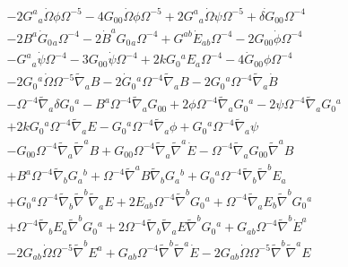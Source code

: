 \begin{eqnarray}
\nonumber\\
&&- 2 G^{a}{}_{a} \dot{\Omega} \phi \Omega^{-5} - 4 G_{00}{} \dot{\Omega} \phi \Omega^{-5}+ 2 G^{a}{}_{a} \dot{\Omega} \psi \Omega^{-5} + \dot{\delta G}_{00}{} \Omega^{-4} 
\nonumber\\
&&- 2 B^{a} \dot{G}_{0}{}_{a} \Omega^{-4} - 2 \dot{B}^{a} G_{0}{}_{a} \Omega^{-4} + G^{ab} \dot{E}_{ab} \Omega^{-4} - 2 G_{00}{} \dot{\phi} \Omega^{-4} \nonumber \\ 
&& -  G^{a}{}_{a} \dot{\psi} \Omega^{-4} - 3 G_{00}{} \dot{\psi} \Omega^{-4} + 2 k G_{0}{}^{a} E_{a} \Omega^{-4} - 4 \dot{G}_{00}{} \phi \Omega^{-4} 
\nonumber\\
&&- 2 G_{0}{}^{a} \dot{\Omega} \Omega^{-5} \tilde{\nabla}_{a}B - 2 \dot{G}_{0}{}^{a} \Omega^{-4} \tilde{\nabla}_{a}B - 2 G_{0}{}^{a} \Omega^{-4} \tilde{\nabla}_{a}\dot{B} 
\nonumber\\
&&-  \Omega^{-4} \tilde{\nabla}_{a}\delta G_{0}{}^{a} 
-  B^{a} \Omega^{-4} \tilde{\nabla}_{a}G_{00}{} + 2 \phi \Omega^{-4} \tilde{\nabla}_{a}G_{0}{}^{a} - 2 \psi \Omega^{-4} \tilde{\nabla}_{a}G_{0}{}^{a} \nonumber \\ 
&& + 2 k G_{0}{}^{a} \Omega^{-4} \tilde{\nabla}_{a}E -  G_{0}{}^{a} \Omega^{-4} \tilde{\nabla}_{a}\phi + G_{0}{}^{a} \Omega^{-4} \tilde{\nabla}_{a}\psi 
\nonumber\\
&&
-  G_{00}{} \Omega^{-4} \tilde{\nabla}_{a}\tilde{\nabla}^{a}B 
+ G_{00}{} \Omega^{-4} \tilde{\nabla}_{a}\tilde{\nabla}^{a}\dot{E}  
-  \Omega^{-4} \tilde{\nabla}_{a}G_{00}{} \tilde{\nabla}^{a}B 
\nonumber\\
&&+ B^{a} \Omega^{-4} \tilde{\nabla}_{b}G_{a}{}^{b} 
+ \Omega^{-4} \tilde{\nabla}^{a}B \tilde{\nabla}_{b}G_{a}{}^{b} + G_{0}{}^{a} \Omega^{-4} \tilde{\nabla}_{b}\tilde{\nabla}^{b}E_{a}  
\nonumber\\
&&+ G_{0}{}^{a} \Omega^{-4} \tilde{\nabla}_{b}\tilde{\nabla}^{b}\tilde{\nabla}_{a}E 
+ 2 E_{ab} \Omega^{-4} \tilde{\nabla}^{b}G_{0}{}^{a} + \Omega^{-4} \tilde{\nabla}_{a}E_{b} \tilde{\nabla}^{b}G_{0}{}^{a}
\nonumber\\
&& + \Omega^{-4} \tilde{\nabla}_{b}E_{a} \tilde{\nabla}^{b}G_{0}{}^{a}  + 2 \Omega^{-4} \tilde{\nabla}_{b}\tilde{\nabla}_{a}E \tilde{\nabla}^{b}G_{0}{}^{a} + G_{ab} \Omega^{-4} \tilde{\nabla}^{b}\dot{E}^{a} 
\nonumber\\
&&- 2 G_{ab} \dot{\Omega} \Omega^{-5} \tilde{\nabla}^{b}E^{a} 
+ G_{ab} \Omega^{-4} \tilde{\nabla}^{b}\tilde{\nabla}^{a}\dot{E} - 2 G_{ab} \dot{\Omega} \Omega^{-5} \tilde{\nabla}^{b}\tilde{\nabla}^{a}E
\nonumber\\  \nonumber\\ 

\end{eqnarray}

